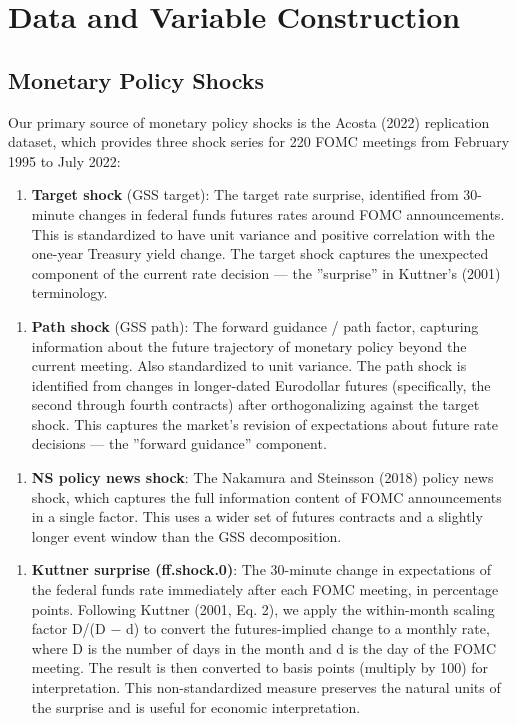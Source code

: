 \documentclass[12pt]{article}
\begin{document}
\section{Data and Variable Construction}

\subsection{Monetary Policy Shocks}

Our primary source of monetary policy shocks is the Acosta (2022) replication dataset, which provides three shock series for 220 FOMC meetings from February 1995 to July 2022:

\begin{enumerate}
\item \textbf{Target shock} (GSS target): The target rate surprise, identified from 30-minute changes in federal funds futures rates around FOMC announcements. This is standardized to have unit variance and positive correlation with the one-year Treasury yield change. The target shock captures the unexpected component of the current rate decision --- the ''surprise'' in Kuttner's (2001) terminology.
\end{enumerate}

\begin{enumerate}
\item \textbf{Path shock} (GSS path): The forward guidance / path factor, capturing information about the future trajectory of monetary policy beyond the current meeting. Also standardized to unit variance. The path shock is identified from changes in longer-dated Eurodollar futures (specifically, the second through fourth contracts) after orthogonalizing against the target shock. This captures the market's revision of expectations about future rate decisions --- the ''forward guidance'' component.
\end{enumerate}

\begin{enumerate}
\item \textbf{NS policy news shock}: The Nakamura and Steinsson (2018) policy news shock, which captures the full information content of FOMC announcements in a single factor. This uses a wider set of futures contracts and a slightly longer event window than the GSS decomposition.
\end{enumerate}

\begin{enumerate}
\item \textbf{Kuttner surprise (ff.shock.0)}: The 30-minute change in expectations of the federal funds rate immediately after each FOMC meeting, in percentage points. Following Kuttner (2001, Eq. 2), we apply the within-month scaling factor D/(D $-$ d) to convert the futures-implied change to a monthly rate, where D is the number of days in the month and d is the day of the FOMC meeting. The result is then converted to basis points (multiply by 100) for interpretation. This non-standardized measure preserves the natural units of the surprise and is useful for economic interpretation.
\end{enumerate}
\end{document}
